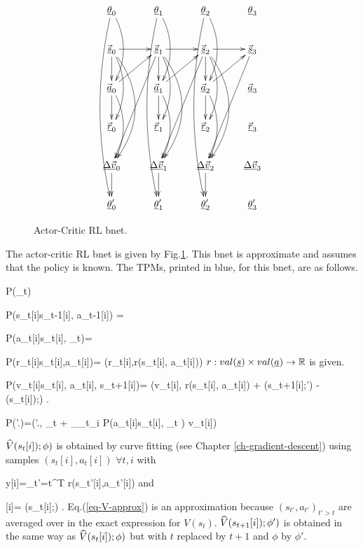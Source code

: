 \begin{figure}
\centering
$$\xymatrix{
\rvtheta_0\ar@/^1pc/[dd]\ar@/_1pc/[ddddd]&
\rvtheta_1\ar@/^1pc/[dd]\ar@/_1pc/[ddddd]&
\rvtheta_2\ar@/^1pc/[dd]\ar@/_1pc/[ddddd]&
\rvtheta_3\\
\vec{\rvs}_0\ar[r]\ar[d]\ar@/^1pc/[dd]
\ar@/^2pc/[ddd]&
\vec{\rvs}_1\ar[r]\ar[d]\ar@/^1pc/[dd]
\ar@/^2pc/[ddd]\ar[dddl]&
\vec{\rvs}_2\ar[r]\ar[d]\ar@/^1pc/[dd]
\ar@/^2pc/[ddd]\ar[dddl]&
\vec{\rvs}_3\ar[dddl]\\
\vec{\rva}_0\ar[d]\ar[ur]\ar@/^1pc/[dd]&
\vec{\rva}_1\ar[d]\ar[ur]\ar@/^1pc/[dd]&
\vec{\rva}_2\ar[d]\ar[ur]\ar@/^1pc/[dd]&
\vec{\rva}_3\\
\vec{\rvr}_0&
\vec{\rvr}_1&
\vec{\rvr}_2&
\vec{\rvr}_3\\
\ul{\Delta \vec{v}}_0\ar[d]&
\ul{\Delta \vec{v}}_1\ar[d]&
\ul{\Delta \vec{v}}_2\ar[d]&
\ul{\Delta \vec{v}}_3\\
\rvtheta'_0&
\rvtheta'_1&
\rvtheta'_2&
\rvtheta'_3
}$$
\caption{Actor-Critic RL bnet.  }
\label{fig-ac-rl}
\end{figure}
The actor-critic RL bnet
is given by Fig.\ref{fig-ac-rl}. This
bnet is approximate and assumes
that the policy is known. The
TPMs, printed in blue, for this bnet,
are as follows.



\beq\color{blue}
P(\theta_t) 
\eeq

\beq\color{blue}
P(s_t[i]\cond s_{t-1}[i], a_{t-1}[i]) =  
\eeq

\beq\color{blue}
P(a_t[i]\cond s_t[i], \theta_t)= 
\eeq

\beq\color{blue}
P(r_t[i]\cond s_t[i],a_t[i])=
\delta(r_t[i],r(s_t[i], a_t[i]))
\eeq
$r:val(\rvs)\times val(\rva)\rarrow\RR $ is given.

\beq\color{blue}
P(\Delta v_t[i]\cond s_t[i], a_t[i], s_{t+1}[i])=
\delta(\Delta v_t[i], r(s_t[i], a_t[i]) +
\gamma {}(s_{t+1}[i];\phi')
- (s_t[i]);\phi)
\;.
\eeq

\beq\color{blue}
P(\theta'.)=\delta(\theta'.,
\theta_t +
\alpha \partial_{\theta_t}\sum_i
\ln P(a_t[i]\cond s_t[i], \theta_t )
\Delta v_t[i])
\eeq

${\widehat{V}}(s_t[i]);\phi)$ is
obtained by curve fitting
 (see Chapter \ref{ch-gradient-descent})
using samples $(s_t[i], a_t[i])$ 
$\forall t,i$
with

\beq
 y[i]=\sum_{t'=t}^{T}
r(s_{t'}[i],a_{t'}[i])
\label{eq-V-approx}
\eeq
and 

\beq
{}[i]=
(s_t[i];\phi)
\;.
\eeq
Eq.(\ref{eq-V-approx}) 
is an approximation
because $(s_{t'}, a_{t'})_{t'>t}$ 
are averaged over in the exact
expression for $V(s_t)$.
${\widehat{V}}(s_{t+1}[i]);\phi')$ is
obtained in the same way as
${\widehat{V}}(s_t[i]);\phi)$
but with $t$ replaced by $t+1$
and $\phi$ by $\phi'$.

